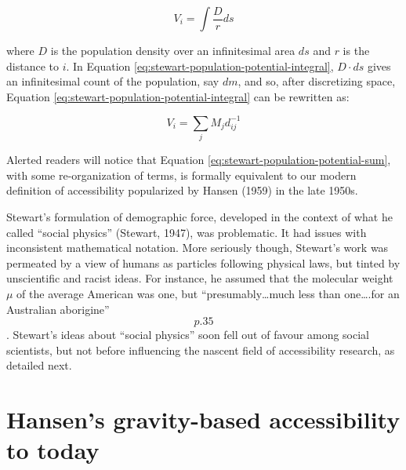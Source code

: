 \documentclass[
11pt, %
oneside, %
english, %
singlespacing, %
]{macthesis} %
\begin{document}
\begin{equation}
\label{eq:stewart-population-potential-integral}
V_i = \int\frac{D}{r} ds
\end{equation} 

\noindent where \(D\) is the population density over an infinitesimal area \(ds\) and \(r\) is the distance to \(i\). In Equation \ref{eq:stewart-population-potential-integral}, \(D\cdot ds\) gives an infinitesimal count of the population, say \(dm\), and so, after discretizing space, Equation \ref{eq:stewart-population-potential-integral} can be rewritten as:

\begin{equation}
\label{eq:stewart-population-potential-sum}
V_i = \sum_j M_jd_{ij}^{-1}
\end{equation} 

Alerted readers will notice that Equation \ref{eq:stewart-population-potential-sum}, with some re-organization of terms, is formally equivalent to our modern definition of accessibility popularized by Hansen (1959) in the late 1950s.

Stewart's formulation of demographic force, developed in the context of what he called ``social physics'' (Stewart, 1947), was problematic. It had issues with inconsistent mathematical notation. More seriously though, Stewart's work was permeated by a view of humans as particles following physical laws, but tinted by unscientific and racist ideas. For instance, he assumed that the molecular weight \(\mu\) of the average American was one, but ``presumably\ldots much less than one\ldots.for an Australian aborigine'' \[p. 35\]. Stewart's ideas about ``social physics'' soon fell out of favour among social scientists, but not before influencing the nascent field of accessibility research, as detailed next.

\section{Hansen's gravity-based accessibility to today}\label{grav-to-today}
\end{document}
